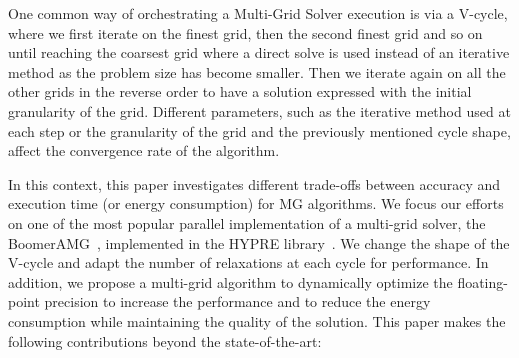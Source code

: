One common way of orchestrating a Multi-Grid Solver execution is via a V-cycle,
where we first iterate on the finest grid, then the second finest grid and so
on until reaching the coarsest grid where a direct solve is used instead of an
iterative method as the problem size has become smaller.  Then we iterate again
on all the other grids in the reverse order to have a solution expressed with
the initial granularity of the grid.  Different parameters, such as the iterative
method used at each step or the granularity of the grid and the previously
mentioned cycle shape, affect the convergence rate of the algorithm.


In this context, this paper investigates different trade-offs between accuracy
and execution time (or energy consumption) for MG algorithms. We focus our
efforts on one of the most popular parallel implementation of a multi-grid
solver, the BoomerAMG~\cite{boomerAMG}, implemented in the HYPRE
library~\cite{Falgout2002}. We change the shape of the V-cycle and adapt the
number of relaxations at each cycle for performance. In addition, we propose a
multi-grid algorithm to dynamically optimize the floating-point precision to
increase the performance and to reduce the energy consumption while maintaining
the quality of the solution.  This paper makes the following contributions
beyond the state-of-the-art:

